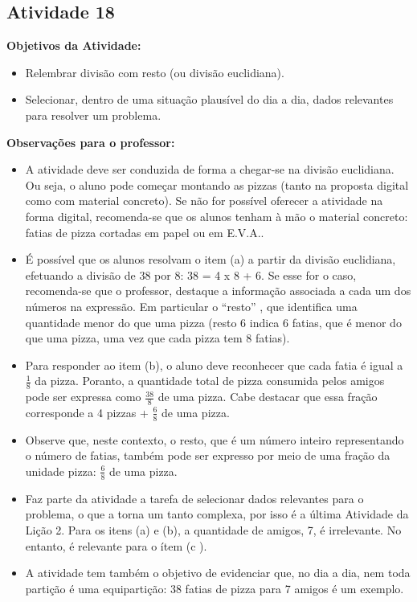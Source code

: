 \begin{multicols}{2}
\subsection{Atividade 18}

{\bf Objetivos da Atividade:}\vspace{.1cm}

\begin{itemize} %
    \item       Relembrar divisão com resto (ou divisão euclidiana).
    \item       Selecionar, dentro de uma situação plausível do dia a dia, dados relevantes para resolver um problema.
\end{itemize} %
\vspace{.1cm}

{\bf Observações para o professor:}\vspace{.1cm}

\begin{itemize} %
    \item       A atividade deve ser conduzida de forma a chegar-se na divisão euclidiana. Ou seja, o aluno pode começar montando as pizzas (tanto na proposta digital como com material concreto). Se não for possível oferecer a atividade na forma digital, recomenda-se que os alunos tenham à mão o material concreto: fatias de pizza cortadas em papel ou em E.V.A..
    \item       É possível que os alunos resolvam o item (a) a partir da divisão euclidiana, efetuando a divisão de 38 por 8: 38 = 4 x 8 + 6. Se esse for o caso, recomenda-se que o professor, destaque a informação associada a cada um dos números na expressão. Em particular o       ``resto''      , que identifica uma quantidade menor do que uma pizza (resto 6 indica 6 fatias, que é menor do que uma pizza, uma vez que cada pizza tem 8 fatias).
    \item       Para responder ao item (b), o aluno deve reconhecer que cada fatia é igual a       $\frac{1}{8}$       da pizza. Poranto, a quantidade total de pizza consumida pelos amigos pode ser expressa como       $\frac{38}{8}$       de uma pizza. Cabe destacar que essa fração corresponde a 4 pizzas +       $\frac{6}{8}$       de uma pizza.
    \item        Observe que, neste contexto, o resto, que é um número inteiro representando o número de fatias, também pode ser expresso por meio de uma fração da unidade pizza:       $\frac{6}{8}$       de uma pizza.
    \item       Faz parte da atividade a tarefa de selecionar dados relevantes para o problema, o que a torna um tanto complexa, por isso é a última Atividade da Lição 2. Para os itens (a) e (b), a quantidade de amigos, 7, é irrelevante. No entanto, é relevante para o ítem (c ).
    \item       A atividade tem também o objetivo de evidenciar que, no dia a dia, nem toda partição é uma equipartição: 38 fatias de pizza para 7 amigos é um exemplo.
\end{itemize} %




\end{multicols}
